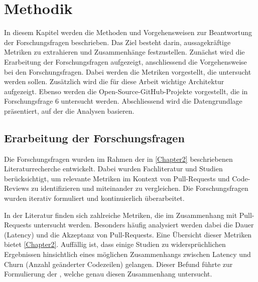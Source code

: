 


\chapter{Methodik} %

\label{Chapter3} %

In diesem Kapitel werden die Methoden und Vorgehensweisen zur Beantwortung der Forschungsfragen beschrieben. Das Ziel besteht darin, aussagekräftige Metriken zu extrahieren und Zusammenhänge festzustellen.
Zunächst wird die Erarbeitung der Forschungsfragen aufgezeigt, anschliessend die Vorgehensweise bei den Forschungsfragen. Dabei werden die Metriken vorgestellt, die untersucht werden sollen. Zusätzlich wird die für diese Arbeit wichtige Architektur aufgezeigt. Ebenso werden die Open-Source-GitHub-Projekte vorgestellt, die in Forschungsfrage 6 untersucht werden. Abschliessend wird die Datengrundlage präsentiert, auf der die Analysen basieren.

\section{Erarbeitung der Forschungsfragen}
\label{sec:ErarbeitungFF}
Die Forschungsfragen wurden im Rahmen der in \autoref{Chapter2} beschriebenen Literaturrecherche entwickelt. Dabei wurden Fachliteratur und Studien berücksichtigt, um relevante Metriken im Kontext von Pull-Requests und Code-Reviews zu identifizieren und miteinander zu vergleichen. Die Forschungsfragen wurden iterativ formuliert und kontinuierlich überarbeitet.

In der Literatur finden sich zahlreiche Metriken, die im Zusammenhang mit Pull-Requests untersucht werden. Besonders häufig analysiert werden dabei die Dauer (Latency) und die Akzeptanz von Pull-Requests. Eine Übersicht dieser Metriken bietet \autoref{Chapter2}. Auffällig ist, dass einige Studien zu widersprüchlichen Ergebnissen hinsichtlich eines möglichen Zusammenhangs zwischen Latency und Churn (Anzahl geänderter Codezeilen) gelangen. Dieser Befund führte zur Formulierung der , welche genau diesen Zusammenhang untersucht.

